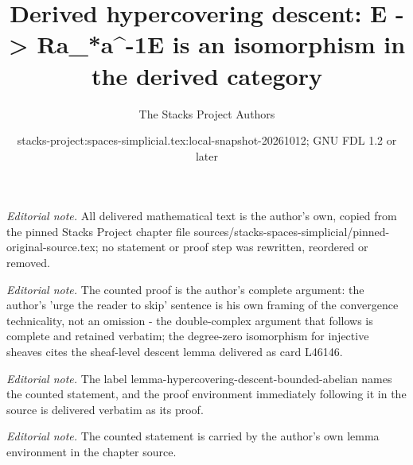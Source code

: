\documentclass{stacks-project}
\title{Derived hypercovering descent: E -> Ra\_*a\textasciicircum{}-1E is an isomorphism in the derived category}
\author{The Stacks Project Authors}
\date{stacks-project:spaces-simplicial.tex:local-snapshot-20261012; GNU FDL 1.2 or later}
\theoremstyle{plain}
\theoremstyle{definition}
\theoremstyle{remark}
\numberwithin{equation}{subsection}
\begin{document}
\maketitle
\noindent\textit{Editorial note.} All delivered mathematical text is the author's own, copied from the pinned Stacks Project chapter file sources/stacks-spaces-simplicial/pinned-original-source.tex; no statement or proof step was rewritten, reordered or removed.\par\medskip
\noindent\textit{Editorial note.} The counted proof is the author's complete argument: the author's 'urge the reader to skip' sentence is his own framing of the convergence technicality, not an omission - the double-complex argument that follows is complete and retained verbatim; the degree-zero isomorphism for injective sheaves cites the sheaf-level descent lemma delivered as card L46146.\par\medskip
\noindent\textit{Editorial note.} The label lemma-hypercovering-descent-bounded-abelian names the counted statement, and the proof environment immediately following it in the source is delivered verbatim as its proof.\par\medskip
\noindent\textit{Editorial note.} The counted statement is carried by the author's own lemma environment in the chapter source.\par\medskip
\end{document}
